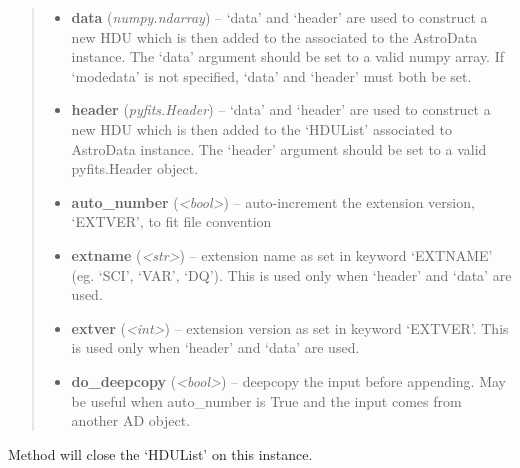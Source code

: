 \documentclass[letterpaper,10pt,english]{sphinxmanual}
\begin{document}
\begin{fulllineitems}
\begin{fulllineitems}
\begin{quote}
\begin{description}
\begin{itemize}
\item {} 
\textbf{data} (\emph{numpy.ndarray}) -- `data' and `header' are used to construct a new HDU which
is then added to the  associated to the 
AstroData instance. The `data' argument should be set to 
a valid numpy array. If `modedata' is not specified, 
`data' and `header' must both be set.

\item {} 
\textbf{header} (\emph{pyfits.Header}) -- `data' and `header' are used to construct a new 
HDU which is then added to the `HDUList' associated to 
AstroData instance. The `header' argument should be set 
to a valid pyfits.Header object.

\item {} 
\textbf{auto\_number} (\emph{\textless{}bool\textgreater{}}) -- auto-increment the extension version, `EXTVER', 
to fit file convention

\item {} 
\textbf{extname} (\emph{\textless{}str\textgreater{}}) -- extension name as set in keyword `EXTNAME' 
(eg. `SCI', `VAR', `DQ'). This is used only when 
`header' and `data' are used.

\item {} 
\textbf{extver} (\emph{\textless{}int\textgreater{}}) -- extension version as set in keyword `EXTVER'. This is 
used only when `header' and `data' are used.

\item {} 
\textbf{do\_deepcopy} (\emph{\textless{}bool\textgreater{}}) -- deepcopy the input before appending. May be useful
when auto\_number is True and the input comes from 
another AD object.

\end{itemize}

\end{description}\end{quote}

\end{fulllineitems}


\begin{fulllineitems}
\label{astro_class:astrodata.AstroData.AstroData.close}
Method will close the `HDUList' on this instance.

\end{fulllineitems}



\end{fulllineitems}
\end{document}

